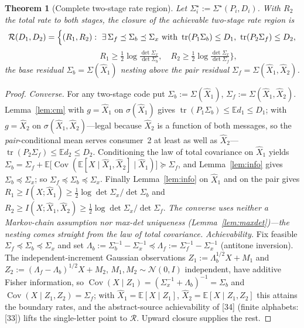 \documentclass[lettersize,onecolumn]{IEEEtran}
\newtheorem{theorem}{Theorem}
\theoremstyle{definition}
\theoremstyle{remark}
\newcommand{\tr}{\operatorname{tr}}
\newcommand{\E}{\mathbb{E}}
\newcommand{\Cov}{\operatorname{Cov}}
\begin{document}
\begin{theorem}[Complete two-stage rate region]\label{thm:region}
Let $\Sigma_i^\star:=\Sigma^\star(P_i,D_i)$. With $R_2$ the total rate to both stages, the
closure of the achievable two-stage rate region is
\[
\mathcal R(D_1,D_2)=\Bigl\{(R_1,R_2):\ \exists\,\Sigma_f\preceq\Sigma_b\preceq\Sigma_x
\text{ with }\tr(P_1\Sigma_b)\le D_1,\ \tr(P_2\Sigma_f)\le D_2,
\]
\[
\qquad\qquad R_1\ge\tfrac12\log\tfrac{\det\Sigma_x}{\det\Sigma_b},\quad
R_2\ge\tfrac12\log\tfrac{\det\Sigma_x}{\det\Sigma_f}\Bigr\},
\]
the base residual $\Sigma_b=\Sigma(\hat X_1)$ nesting above the pair residual
$\Sigma_f=\Sigma(\hat X_1,\hat X_2)$.
\end{theorem}
\begin{proof}
\emph{Converse.} For any two-stage code put $\Sigma_b:=\Sigma(\hat X_1)$,
$\Sigma_f:=\Sigma(\hat X_1,\hat X_2)$. Lemma~\ref{lem:cm} with $g=\hat X_1$ on
$\sigma(\hat X_1)$ gives $\tr(P_1\Sigma_b)\le\E d_1\le D_1$; with $g=\hat X_2$ on
$\sigma(\hat X_1,\hat X_2)$---legal because $\hat X_2$ is a function of both messages, so
the \emph{pair}-conditional mean serves consumer~2 at least as well as $\hat
X_2$---$\tr(P_2\Sigma_f)\le\E d_2\le D_2$. Conditioning the law of total covariance on
$\hat X_1$ yields $\Sigma_b=\Sigma_f+\E\bigl[\Cov(\E[X\mid\hat X_1,\hat X_2]\mid\hat
X_1)\bigr]\succeq\Sigma_f$, and Lemma~\ref{lem:info} gives $\Sigma_b\preceq\Sigma_x$; so
$\Sigma_f\preceq\Sigma_b\preceq\Sigma_x$. Finally Lemma~\ref{lem:info} on $\hat X_1$ and
on the pair gives $R_1\ge I(X;\hat X_1)\ge\tfrac12\log\det\Sigma_x/\det\Sigma_b$ and
$R_2\ge I(X;\hat X_1,\hat X_2)\ge\tfrac12\log\det\Sigma_x/\det\Sigma_f$. \emph{The converse
uses neither a Markov-chain assumption nor max-det uniqueness
(Lemma~\ref{lem:maxdet})---the nesting comes straight from the law of total covariance.} \emph{Achievability.} Fix feasible $\Sigma_f\preceq\Sigma_b
\preceq\Sigma_x$ and set $\Lambda_b:=\Sigma_b^{-1}-\Sigma_x^{-1}\preceq\Lambda_f:=
\Sigma_f^{-1}-\Sigma_x^{-1}$ (antitone inversion). The independent-increment Gaussian
observations $Z_1:=\Lambda_b^{1/2}X+M_1$ and $Z_2:=(\Lambda_f-\Lambda_b)^{1/2}X+M_2$,
$M_1,M_2\sim\mathcal N(0,I)$ independent, have additive Fisher information, so
$\Cov(X\mid Z_1)=(\Sigma_x^{-1}+\Lambda_b)^{-1}=\Sigma_b$ and $\Cov(X\mid Z_1,Z_2)=
\Sigma_f$; with $\hat X_1=\E[X\mid Z_1]$, $\hat X_2=\E[X\mid Z_1,Z_2]$ this attains the
boundary rates, and the abstract-source achievability of [34] (finite
alphabets: [33]) lifts the single-letter point to $\mathcal R$. Upward closure
supplies the rest.
\end{proof}
\end{document}

